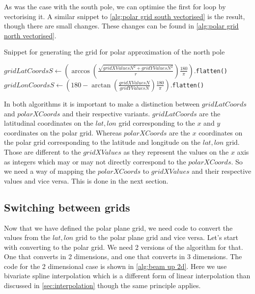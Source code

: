 As was the case with the south pole, we can optimise the first for loop by vectorising it. A similar snippet to \autoref{alg:polar grid south vectorised} is the result, though there are small 
changes. These changes can be found in \autoref{alg:polar grid north vectorised}.

\begin{algorithm}[htb]
    \caption{Snippet for generating the grid for polar approximation of the north pole}
    \label{alg:polar grid north vectorised}
    $gridLatCoordsS \leftarrow (\arccos(\frac{\sqrt{gridXValuesN^2 + gridYValuesN^2}}{r})\frac{180}{\pi}).$\texttt{flatten()} \;
    $gridLonCoordsS \leftarrow (180 - \arctan(\frac{gridXValuesN}{gridYValuesN})\frac{180}{\pi}).$\texttt{flatten()} \;
\end{algorithm}

In both algorithms it is important to make a distinction between $gridLatCoords$ and $polarXCoords$ and their respective variants. $gridLatCoords$ are the latitudinal coordinates on the 
$lat, lon$ grid corresponding to the $x$ and $y$ coordinates on the polar grid. Whereas $polarXCoords$ are the $x$ coordinates on the polar grid corresponding to the latitude and longitude on 
the $lat, lon$ grid. Those are different to the $gridXValues$ as they represent the values on the $x$ axis as integers which may or may not directly correspond to the $polarXCoords$. So we need 
a way of mapping the $polarXCoords$ to $gridXValues$ and their respective values and vice versa. This is done in the next section.

\subsection{Switching between grids}
Now that we have defined the polar plane grid, we need code to convert the values from the $lat, lon$ grid to the polar plane grid and vice versa. Let's start with converting to the polar grid. 
We need 2 versions of the algorithm for that. One that converts in 2 dimensions, and one that converts in 3 dimensions. The code for the 2 dimensional case is shown in \autoref{alg:beam up 2d}.
Here we use bivariate spline interpolation \cite{bivariatespline} which is a different form of linear interpolation than discussed in \autoref{sec:interpolation} though the same principle 
applies.

